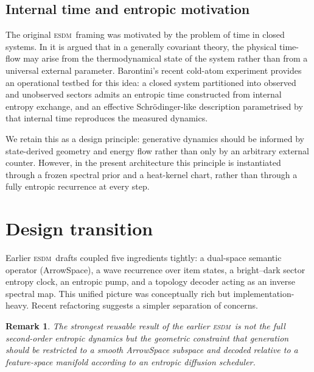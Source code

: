 \documentclass[11pt]{article}
\newtheorem{remark}{Remark}
\newcommand{\ESDM}{\textsc{esdm}}
\begin{document}
\subsection{Internal time and entropic motivation}
\label{sec:internal_time}

The original \ESDM~framing was motivated by the problem of time in closed
systems. In \cite{ConnesRovelli1994} it is argued that in a generally covariant theory, the
physical time-flow may arise from the thermodynamical state of the system
rather than from a universal external parameter. Barontini's recent cold-atom
experiment \cite{Barontini2026} provides an operational testbed for this idea: a closed system
partitioned into observed and unobserved sectors admits an entropic time
constructed from internal entropy exchange, and an effective Schr\"odinger-like
description parametrised by that internal time reproduces the measured
dynamics.

We retain this as a design principle: generative dynamics should be informed by
state-derived geometry and energy flow rather than only by an arbitrary external
counter. However, in the present architecture this principle is instantiated
through a frozen spectral prior and a heat-kernel chart, rather than through a
fully entropic recurrence at every step.

\section{Design transition}
\label{sec:transition}

Earlier \ESDM~drafts coupled five ingredients tightly: a dual-space semantic
operator (ArrowSpace), a wave recurrence over item states, a bright--dark sector entropy
clock, an entropic pump, and a topology decoder acting as an inverse spectral
map. This unified picture was conceptually rich but implementation-heavy.
Recent refactoring suggests a simpler separation of concerns.

\begin{remark}
The strongest reusable result of the earlier \ESDM~is not the full
second-order entropic dynamics but the geometric constraint that generation
should be restricted to a smooth ArrowSpace subspace and decoded relative to a
feature-space manifold according to an entropic diffusion scheduler.
\end{remark}
\end{document}
